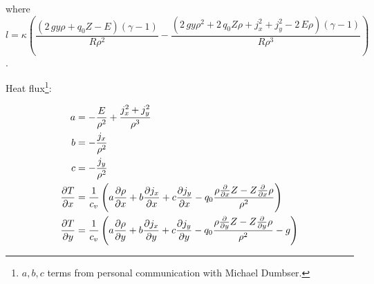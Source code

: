 where
\begin{equation}
l = \kappa {\left(\frac{{\left(2 \, g y \rho + q_{0} Z - E\right)} {\left(\gamma - 1\right)}}{R \rho^{2}} - \frac{{\left(2 \, g y \rho^{2} + 2 \, q_{0} Z \rho + j_{x}^{2} + j_{y}^{2} - 2 \, E \rho\right)} {\left(\gamma - 1\right)}}{R \rho^{3}}\right)}  
\end{equation}
.

Heat flux\footnote{$a,b,c$ terms from personal communication with Michael Dumbser.}:
\newcommand{\Td}[1]{
  \frac{1}{c_v} \left(
  a \pdv{\rho}{#1} +
  b \pdv{j_x}{#1} +
  c \pdv{j_y}{#1}
 - q_0 \frac{{\rho \frac{\partial}{\partial #1}Z - Z \frac{\partial}{\partial #1}\rho}}{\rho^{2}} 
\IfSubStr{#1}{y}{-g}{}
  \right)
}

\begin{align}
  \begin{split}
  a &=  -\frac{E}{\rho^{2}} + \frac{j_{x}^{2} + j_{y}^{2}}{\rho^{3}} \\
  b &= -\frac{j_{x}}{\rho^{2}}\\
  c &=-\frac{j_{y}}{\rho^{2}}\\
  \pdv{T}{x} &= \Td{x}\\
  \pdv{T}{y} &= \Td{y}
  \end{split}
\end{align}
